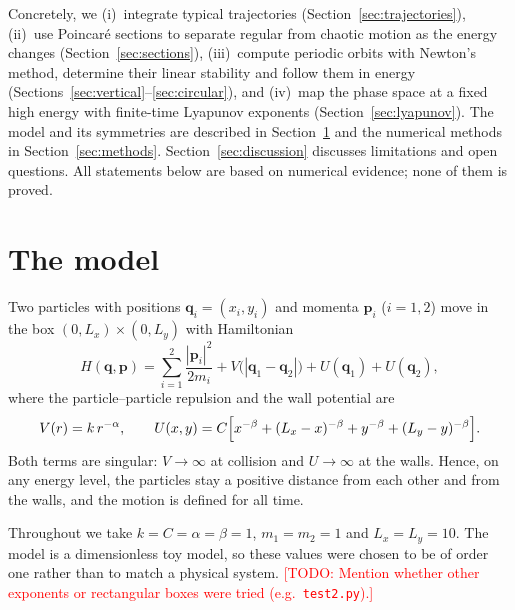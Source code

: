 \documentclass[11pt,a4paper]{article}
\newcommand{\todo}[1]{\textcolor{red}{[TODO: #1]}}
\newcommand{\q}{\mathbf{q}}
\newcommand{\p}{\mathbf{p}}
\begin{document}
Concretely, we
(i)~integrate typical trajectories (Section~\ref{sec:trajectories}),
(ii)~use Poincar\'e sections to separate regular from chaotic motion as the
energy changes (Section~\ref{sec:sections}),
(iii)~compute periodic orbits with Newton's method, determine their linear
stability and follow them in energy
(Sections~\ref{sec:vertical}--\ref{sec:circular}), and
(iv)~map the phase space at a fixed high energy with finite-time Lyapunov
exponents (Section~\ref{sec:lyapunov}).
The model and its symmetries are described in Section~\ref{sec:model} and the
numerical methods in Section~\ref{sec:methods}. Section~\ref{sec:discussion}
discusses limitations and open questions.
All statements below are based on numerical evidence; none of them is proved.

\section{The model}\label{sec:model}

Two particles with positions $\q_i=(x_i,y_i)$ and momenta $\p_i$ ($i=1,2$)
move in the box $(0,L_x)\times(0,L_y)$ with Hamiltonian
\begin{equation}\label{eq:H}
  H(\q,\p)=\sum_{i=1}^{2}\frac{|\p_i|^2}{2m_i}
  + V\bigl(|\q_1-\q_2|\bigr) + U(\q_1) + U(\q_2),
\end{equation}
where the particle--particle repulsion and the wall potential are
\begin{equation}\label{eq:potentials}
  V(r)=k\,r^{-\alpha},\qquad
  U(x,y)=C\Bigl[x^{-\beta}+(L_x-x)^{-\beta}+y^{-\beta}+(L_y-y)^{-\beta}\Bigr].
\end{equation}
Both terms are singular: $V\to\infty$ at collision and $U\to\infty$ at the
walls. Hence, on any energy level, the particles stay a positive distance from
each other and from the walls, and the motion is defined for all time.

Throughout we take $k=C=\alpha=\beta=1$, $m_1=m_2=1$ and $L_x=L_y=10$.
The model is a dimensionless toy model, so these values were chosen to be of
order one rather than to match a physical system.
\todo{Mention whether other exponents or rectangular boxes were tried
(e.g.\ \texttt{test2.py}).}
\end{document}
